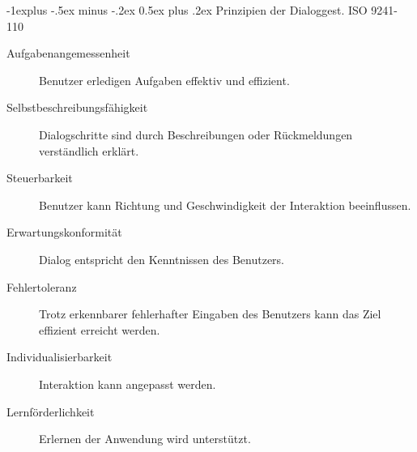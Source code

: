 \documentclass[10pt,landscape,a4paper]{article}
\makeatletter
\renewcommand{\subsection}{\@startsection{subsection}{2}{0mm}%
                                {-1explus -.5ex minus -.2ex}%
                                {0.5ex plus .2ex}%
                                {\normalfont\small\bfseries}}
\makeatother
\begin{document}
\begin{multicols*}{4}
\subsection{Prinzipien der Dialoggest. ISO 9241-110}
\begin{description}
  \item[Aufgabenangemessenheit] Benutzer erledigen Aufgaben effektiv und
    effizient.
  \item[Selbstbeschreibungsfähigkeit] Dialogschritte sind durch Beschreibungen
    oder Rückmeldungen verständlich erklärt.
  \item[Steuerbarkeit] Benutzer kann Richtung und Geschwindigkeit der Interaktion beeinflussen.
  \item[Erwartungskonformität] Dialog entspricht den Kenntnissen des Benutzers.
  \item[Fehlertoleranz] Trotz erkennbarer fehlerhafter Eingaben des Benutzers
    kann das Ziel effizient erreicht werden.
  \item[Individualisierbarkeit] Interaktion kann angepasst werden.
  \item[Lernförderlichkeit] Erlernen der Anwendung wird unterstützt.
\end{description}

  
\end{multicols*}
\end{document}
